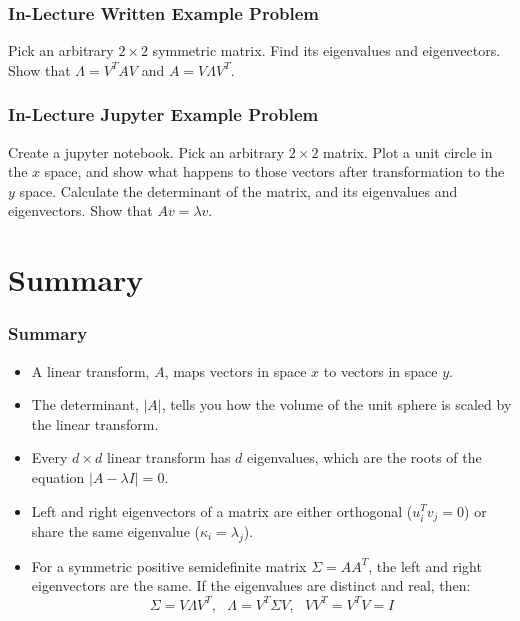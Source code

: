 \documentclass{beamer}
\begin{document}
\begin{frame}
  \frametitle{In-Lecture Written Example Problem}
  
  Pick an arbitrary $2\times 2$ symmetric matrix.  Find its
  eigenvalues and eigenvectors.  Show that $\Lambda=V^TAV$ and
  $A=V\Lambda V^T$.
\end{frame}
  
\begin{frame}
  \frametitle{In-Lecture Jupyter Example Problem}
  
  Create a jupyter notebook.  Pick an arbitrary $2\times 2$ matrix.
  Plot a unit circle in the ${x}$ space, and show what happens to
  those vectors after transformation to the ${y}$ space.
  Calculate the determinant of the matrix, and its eigenvalues and
  eigenvectors.  Show that $A{v}=\lambda{v}$.
  
\end{frame}
  
\section{Summary}
\setcounter{subsection}{1}

\begin{frame}
  \frametitle{Summary}
  \begin{itemize}
  \item A linear transform, $A$, maps vectors in space ${x}$ to vectors in space ${y}$.
  \item The determinant, $|A|$, tells you how the volume of the unit
    sphere is scaled by the linear transform.
  \item Every $d\times d$ linear transform has $d$ eigenvalues, which
    are the roots of the equation $|A-\lambda I|=0$.
  \item Left and right eigenvectors of a matrix are either orthogonal
    (${u}_i^T{v}_j=0$) or share the same eigenvalue ($\kappa_i=\lambda_j$).
  \item For a symmetric positive semidefinite matrix $\Sigma =AA^T$,
    the left and right eigenvectors are the same.  If the eigenvalues
    are distinct and real, then:
    \[
    \Sigma=V\Lambda V^T,~~~\Lambda = V^T\Sigma V,~~~VV^T=V^TV=I
    \]
  \end{itemize}
\end{frame}
\end{document}
